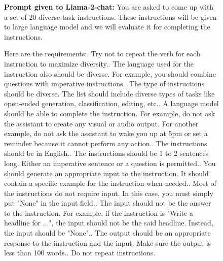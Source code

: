 \begin{figure}[b!]
    \centering
    \begin{tcolorbox}[colframe=metablue, colback=white]
        \scriptsize
        \textbf{Prompt given to Llama-2-chat:} \newline
You are asked to come up with a set of 20 diverse task instructions. These instructions will be given to large language model and we will evaluate it for completing the instructions. \newline

Here are the requirements:. Try not to repeat the verb for each instruction to maximize diversity.. The language used for the instruction also should be diverse. For example, you should combine questions with imperative instructions.. The type of instructions should be diverse. The list should include diverse types of tasks like open-ended generation, classification, editing, etc.. A language model should be able to complete the instruction. For example, do not ask the assistant to create any visual or audio output. For another example, do not ask the assistant to wake you up at 5pm or set a reminder because it cannot perform any action.. The instructions should be in English.. The instructions should be 1 to 2 sentences long. Either an imperative sentence or a question is permitted.. You should generate an appropriate input to the instruction. It should contain a specific example for the instruction when needed.. Most of the instructions do not require input. In this case, you must simply put "None" in the input field.. The input should not be the answer to the instruction. For example, if the instruction is "Write a headline for ...", the input should not be the said headline. Instead, the input should be "None".. The output should be an appropriate response to the instruction and the input. Make sure the output is less than 100 words.. Do not repeat instructions.\newline


\end{tcolorbox}
\end{figure}
